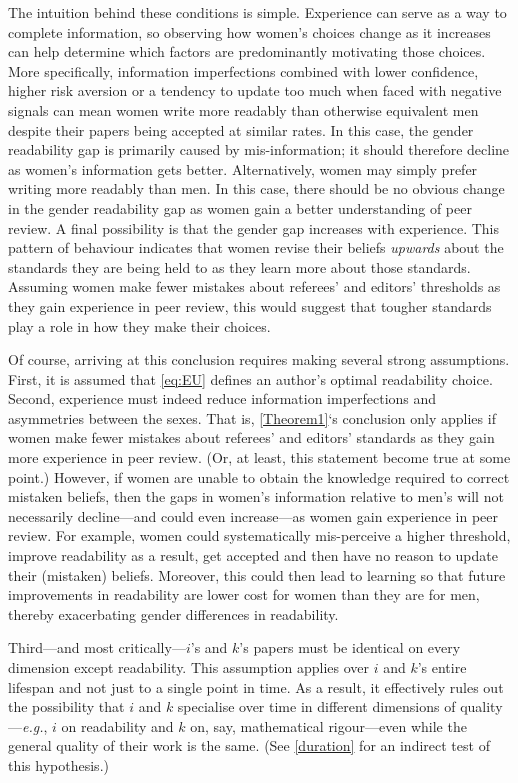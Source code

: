 The intuition behind these conditions is simple. Experience can serve as a way to complete information, so observing how women's choices change as it increases can help determine which factors are predominantly motivating those choices. More specifically, information imperfections combined with lower confidence, higher risk aversion or a tendency to update too much when faced with negative signals can mean women write more readably than otherwise equivalent men despite their papers being accepted at similar rates. In this case, the gender readability gap is primarily caused by mis-information; it should therefore decline as women's information gets better. Alternatively, women may simply prefer writing more readably than men. In this case, there should be no obvious change in the gender readability gap as women gain a better understanding of peer review. A final possibility is that the gender gap increases with experience. This pattern of behaviour indicates that women revise their beliefs \emph{upwards} about the standards they are being held to as they learn more about those standards. Assuming women make fewer mistakes about referees' and editors' thresholds as they gain experience in peer review, this would suggest that tougher standards play a role in how they make their choices.

Of course, arriving at this conclusion requires making several strong assumptions. First, it is assumed that \autoref{eq:EU} defines an author's optimal readability choice. Second, experience must indeed reduce information imperfections and asymmetries between the sexes. That is, \autoref{Theorem1}`s conclusion only applies if women make fewer mistakes about referees' and editors' standards as they gain more experience in peer review. (Or, at least, this statement become true at some point.) However, if women are unable to obtain the knowledge required to correct mistaken beliefs, then the gaps in women's information relative to men's will not necessarily decline---and could even increase---as women gain experience in peer review. For example, women could systematically mis-perceive a higher threshold, improve readability as a result, get accepted and then have no reason to update their (mistaken) beliefs. Moreover, this could then lead to learning so that future improvements in readability are lower cost for women than they are for men, thereby exacerbating gender differences in readability.

Third---and most critically---$i$'s and $k$'s papers must be identical on every dimension except readability. This assumption applies over $i$ and $k$'s entire lifespan and not just to a single point in time. As a result, it effectively rules out the possibility that $i$ and $k$ specialise over time in different dimensions of quality---\emph{e.g.}, $i$ on readability and $k$ on, say, mathematical rigour---even while the general quality of their work is the same. (See \autoref{duration} for an indirect test of this hypothesis.)

